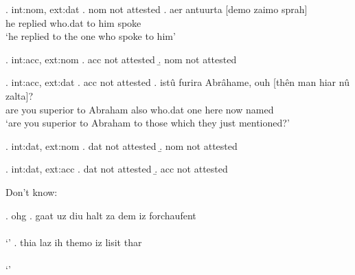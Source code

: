 \ex. \ac{int}:\ac{nom}, \ac{ext}:\ac{dat}
\a. \ac{nom} not attested
\bg. aer antuurta [demo zaimo sprah]\\
 he replied\scsub{[dat]} who.\ac{dat} {to him} spoke\scsub{[nom]}\\
 `he replied to the one who spoke to him' 

\ex. \ac{int}:\ac{acc}, \ac{ext}:\ac{nom}
\a. \ac{acc} not attested
\b. \ac{nom} not attested

\ex. \ac{int}:\ac{acc}, \ac{ext}:\ac{dat}
\a. \ac{acc} not attested
\bg. istû furira Abrâhame, ouh [thên man hiar nû zalta]?\\
 {are you} superior\scsub{[dat]} {to Abraham} also who.\ac{dat} one here now named\scsub{[acc]}\\
 `are you superior to Abraham to those which they just mentioned?' 

\ex. \ac{int}:\ac{dat}, \ac{ext}:\ac{nom}
\a. \ac{dat} not attested
\b. \ac{nom} not attested

\ex. \ac{int}:\ac{dat}, \ac{ext}:\ac{acc}
\a. \ac{dat} not attested
\b. \ac{acc} not attested



Don't know:

\ex. \ac{ohg}
\ag. gaat uz diu halt za dem iz forchaufent\\
 \\
 `' 
\bg. thia laz ih themo iz lisit thar\\
 \\
 `' 

